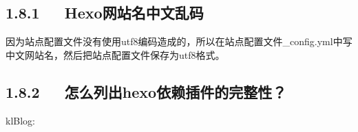 \documentclass[letterpaper,12pt,english]{sphinxmanual}
\begin{document}
\subsection{1.8.1   Hexo网站名中文乱码}
\label{\detokenize{001software/001install/001._u7f51_u7ad9/hexo:id18}}
因为站点配置文件没有使用utf\sphinxhyphen{}8编码造成的，所以在站点配置文件\_config.yml中写中文网站名，然后把站点配置文件保存为utf\sphinxhyphen{}8格式。

\begin{sphinxVerbatim}[commandchars=\\\{\}]
 
 
\end{sphinxVerbatim}


\subsection{1.8.2   怎么列出hexo依赖插件的完整性？}
\label{\detokenize{001software/001install/001._u7f51_u7ad9/hexo:id19}}
\begin{sphinxVerbatim}[commandchars=\\\{\}]
   
\end{sphinxVerbatim}

klBlog:
\end{document}
